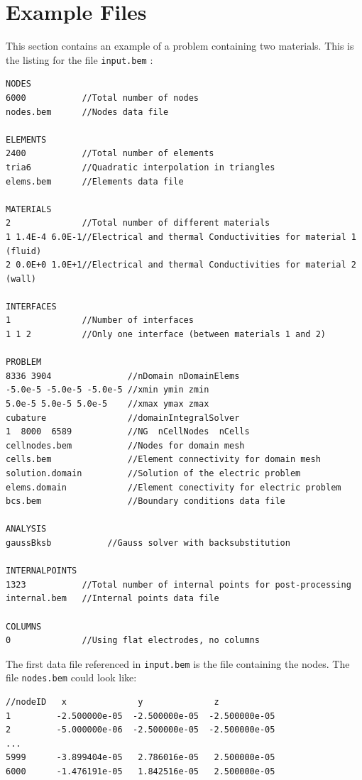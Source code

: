 \documentclass[12pt]{article}
\begin{document}
\pagebreak
\section{Example Files}
This section contains an example of a problem containing two materials. This is the listing for the file \verb+input.bem+ :

\small\begin{verbatim}
NODES
6000           //Total number of nodes   
nodes.bem      //Nodes data file

ELEMENTS
2400           //Total number of elements
tria6          //Quadratic interpolation in triangles
elems.bem      //Elements data file

MATERIALS
2              //Total number of different materials
1 1.4E-4 6.0E-1//Electrical and thermal Conductivities for material 1 (fluid)
2 0.0E+0 1.0E+1//Electrical and thermal Conductivities for material 2 (wall)

INTERFACES
1              //Number of interfaces
1 1 2          //Only one interface (between materials 1 and 2)

PROBLEM
8336 3904               //nDomain nDomainElems
-5.0e-5 -5.0e-5 -5.0e-5 //xmin ymin zmin
5.0e-5 5.0e-5 5.0e-5    //xmax ymax zmax
cubature                //domainIntegralSolver
1  8000  6589           //NG  nCellNodes  nCells
cellnodes.bem           //Nodes for domain mesh
cells.bem               //Element connectivity for domain mesh
solution.domain         //Solution of the electric problem
elems.domain            //Element conectivity for electric problem
bcs.bem                 //Boundary conditions data file

ANALYSIS
gaussBksb	        //Gauss solver with backsubstitution 

INTERNALPOINTS
1323           //Total number of internal points for post-processing
internal.bem   //Internal points data file

COLUMNS
0              //Using flat electrodes, no columns
\end{verbatim}\normalsize

The first data file referenced in \verb+input.bem+ is the file containing the nodes. The file \verb+nodes.bem+ could look like:

\small\begin{verbatim}
//nodeID   x              y              z
1         -2.500000e-05  -2.500000e-05  -2.500000e-05
2         -5.000000e-06  -2.500000e-05  -2.500000e-05
...
5999      -3.899404e-05   2.786016e-05   2.500000e-05
6000      -1.476191e-05   1.842516e-05   2.500000e-05
\end{verbatim}\normalsize
\end{document}
